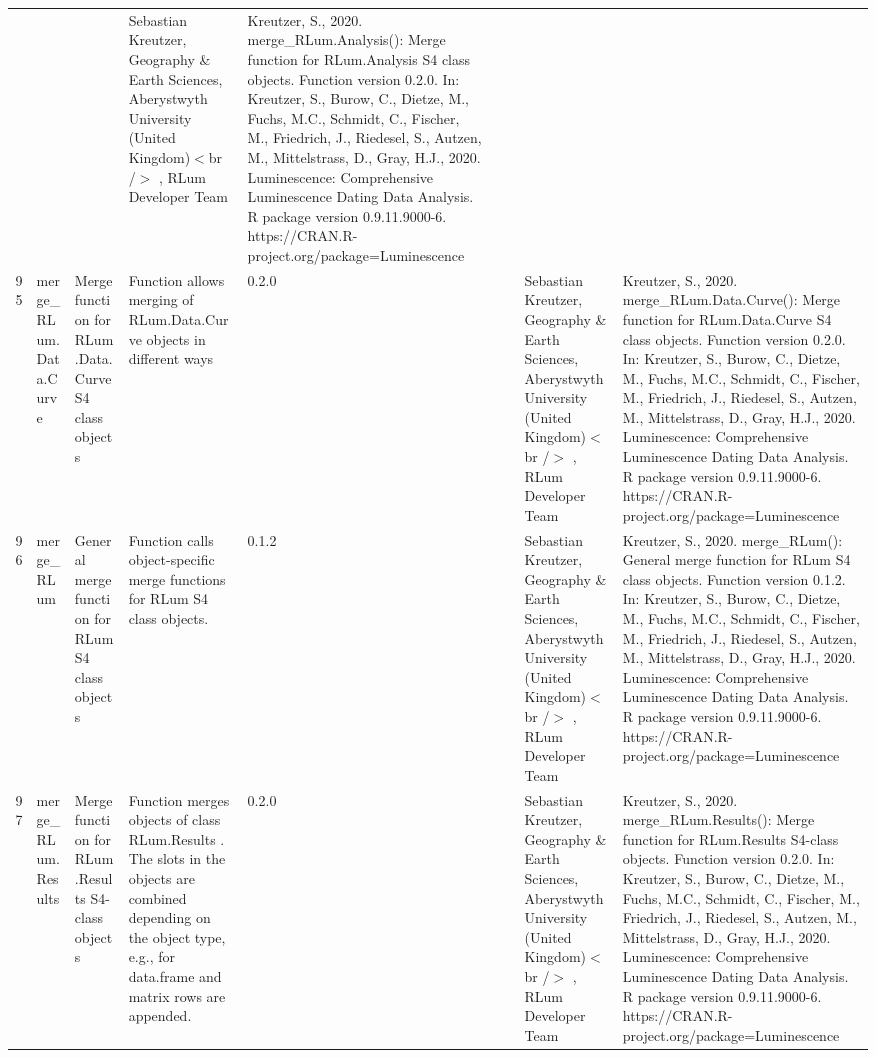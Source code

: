 \begin{table}[ht]
\begin{tabular}{rllllllll}
 &  &  & Sebastian Kreutzer, Geography \& Earth Sciences, Aberystwyth University (United Kingdom)$<$br /$>$ , RLum Developer Team & Kreutzer, S., 2020. merge\_RLum.Analysis(): Merge function for RLum.Analysis S4 class objects. Function version 0.2.0. In: Kreutzer, S., Burow, C., Dietze, M., Fuchs, M.C., Schmidt, C., Fischer, M., Friedrich, J., Riedesel, S., Autzen, M., Mittelstrass, D., Gray, H.J., 2020. Luminescence: Comprehensive Luminescence Dating Data Analysis. R package version 0.9.11.9000-6. https://CRAN.R-project.org/package=Luminescence
 \\ 
  95 & merge\_RLum.Data.Curve & Merge function for RLum.Data.Curve S4 class objects & Function allows merging of RLum.Data.Curve objects in different ways & 0.2.0
 &  &  & Sebastian Kreutzer, Geography \& Earth Sciences, Aberystwyth University (United Kingdom)$<$br /$>$ , RLum Developer Team & Kreutzer, S., 2020. merge\_RLum.Data.Curve(): Merge function for RLum.Data.Curve S4 class objects. Function version 0.2.0. In: Kreutzer, S., Burow, C., Dietze, M., Fuchs, M.C., Schmidt, C., Fischer, M., Friedrich, J., Riedesel, S., Autzen, M., Mittelstrass, D., Gray, H.J., 2020. Luminescence: Comprehensive Luminescence Dating Data Analysis. R package version 0.9.11.9000-6. https://CRAN.R-project.org/package=Luminescence
 \\ 
  96 & merge\_RLum & General merge function for RLum S4 class objects & Function calls object-specific merge functions for RLum S4 class objects. & 0.1.2
 &  &  & Sebastian Kreutzer, Geography \& Earth Sciences, Aberystwyth University (United Kingdom)$<$br /$>$ , RLum Developer Team & Kreutzer, S., 2020. merge\_RLum(): General merge function for RLum S4 class objects. Function version 0.1.2. In: Kreutzer, S., Burow, C., Dietze, M., Fuchs, M.C., Schmidt, C., Fischer, M., Friedrich, J., Riedesel, S., Autzen, M., Mittelstrass, D., Gray, H.J., 2020. Luminescence: Comprehensive Luminescence Dating Data Analysis. R package version 0.9.11.9000-6. https://CRAN.R-project.org/package=Luminescence
 \\ 
  97 & merge\_RLum.Results & Merge function for RLum.Results S4-class objects & Function merges objects of class  RLum.Results . The slots in the objects are combined depending on the object type, e.g., for  data.frame  and  matrix  rows are appended. & 0.2.0
 &  &  & Sebastian Kreutzer, Geography \& Earth Sciences, Aberystwyth University (United Kingdom)$<$br /$>$ , RLum Developer Team & Kreutzer, S., 2020. merge\_RLum.Results(): Merge function for RLum.Results S4-class objects. Function version 0.2.0. In: Kreutzer, S., Burow, C., Dietze, M., Fuchs, M.C., Schmidt, C., Fischer, M., Friedrich, J., Riedesel, S., Autzen, M., Mittelstrass, D., Gray, H.J., 2020. Luminescence: Comprehensive Luminescence Dating Data Analysis. R package version 0.9.11.9000-6. https://CRAN.R-project.org/package=Luminescence

\end{tabular}
\end{table}
